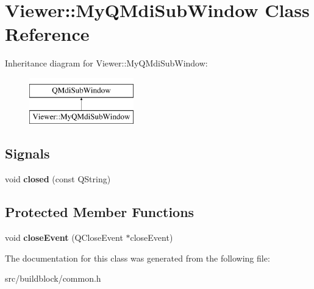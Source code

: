 \hypertarget{classViewer_1_1MyQMdiSubWindow}{}\section{Viewer\+:\+:My\+Q\+Mdi\+Sub\+Window Class Reference}
\label{classViewer_1_1MyQMdiSubWindow}
Inheritance diagram for Viewer\+:\+:My\+Q\+Mdi\+Sub\+Window\+:\begin{figure}[H]
\begin{center}
\leavevmode
\includegraphics[height=2.000000cm]{classViewer_1_1MyQMdiSubWindow}
\end{center}
\end{figure}
\subsection*{Signals}
\begin{DoxyCompactItemize}
\item 
\mbox{\label{classViewer_1_1MyQMdiSubWindow_a4823064b756078452d45e038dc650530}} 
void {\bfseries closed} (const Q\+String)
\end{DoxyCompactItemize}
\subsection*{Protected Member Functions}
\begin{DoxyCompactItemize}
\item 
\mbox{\label{classViewer_1_1MyQMdiSubWindow_a972a45a12cf25764eaa6b00722df0f68}} 
void {\bfseries close\+Event} (Q\+Close\+Event $\ast$close\+Event)
\end{DoxyCompactItemize}


The documentation for this class was generated from the following file\+:\begin{DoxyCompactItemize}
\item 
src/buildblock/common.\+h\end{DoxyCompactItemize}
